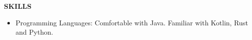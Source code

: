 \documentclass[10pt, letterpaper]{article}
\begin{document}

\textbf{SKILLS}
\smallskip 
\begin{itemize}
\item Programming Languages: Comfortable with Java. Familiar with Kotlin, Rust and Python.
\end{itemize} 

\end{document}

